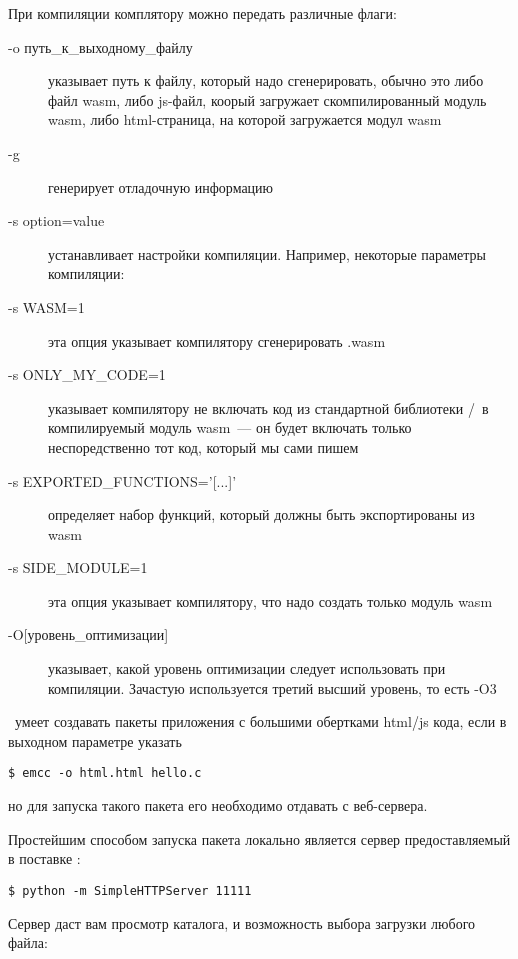 При компиляции комплятору можно передать различные флаги:
\begin{description}

\item[-o путь\_к\_выходному\_файлу] указывает путь к файлу, который надо
сгенерировать, обычно это либо файл wasm, либо js-файл, коорый загружает
скомпилированный модуль wasm, либо html-страница, на которой загружается модул
wasm

\item[-g] генерирует отладочную информацию

\item[-s option=value] устанавливает настройки компиляции. Например, некоторые
параметры компиляции:

\item[-s WASM=1] эта опция указывает компилятору сгенерировать .wasm

\item[-s ONLY\_MY\_CODE=1] указывает компилятору не включать код из стандартной
библиотеки \emc/\cpp\ в компилируемый модуль wasm\ --- он будет включать только
неспоредственно тот код, который мы сами пишем

\item[-s EXPORTED\_FUNCTIONS='{[}...{]}'] определяет набор функций, который
должны быть экспортированы из wasm

\item[-s SIDE\_MODULE=1] эта опция указывает компилятору, что надо создать
только модуль wasm

\item[-O{[}уровень\_оптимизации{]}] указывает, какой уровень оптимизации следует
использовать при компиляции. Зачастую используется третий высший уровень, то
есть -O3

\end{description}


\ems\ умеет создавать пакеты приложения с большими обертками html/js кода, если
в выходном параметре указать
\begin{verbatim}
$ emcc -o html.html hello.c
\end{verbatim}
но для запуска такого пакета его необходимо отдавать с веб-сервера.

Простейшим способом запуска пакета локально является сервер предоставляемый в
поставке \py:
\begin{verbatim}
$ python -m SimpleHTTPServer 11111
\end{verbatim}

Сервер даст вам просмотр каталога, и возможность выбора загрузки любого файла:

\bigskip
{}

\secup
